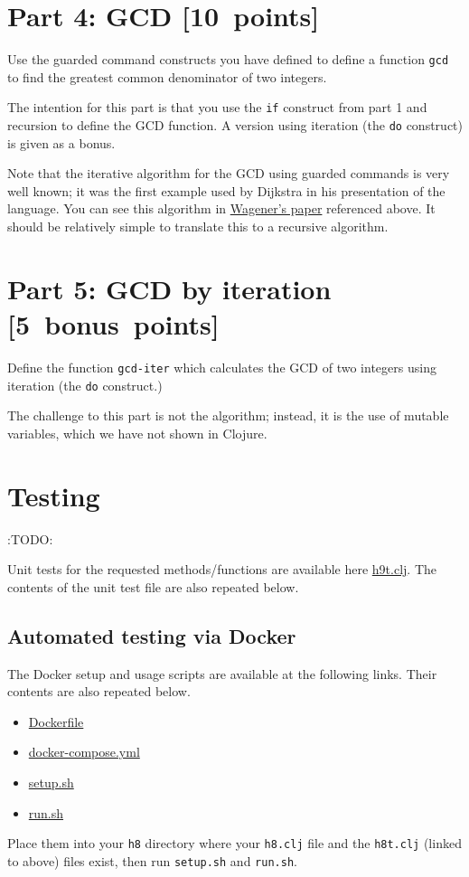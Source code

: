 \documentclass[11pt]{article}
\begin{document}
\section*{Part 4: GCD                                                   [10 points]}
\label{sec:org132c674}
Use the guarded command constructs you have defined
to define a function \texttt{gcd} to find the greatest common denominator
of two integers.

The intention for this part is that you use the \texttt{if} construct
from part 1 and recursion to define the GCD function.
A version using iteration (the \texttt{do} construct) is given as a bonus.

Note that the iterative algorithm for the GCD using guarded commands is
very well known; it was the first example used by Dijkstra
in his presentation of the language.
You can see this algorithm in
\href{https://dl.acm.org/doi/10.5555/1074100.1074433}{Wagener's paper} referenced above.
It should be relatively simple to translate this to a recursive algorithm.

\section*{Part 5: GCD by iteration [5 bonus points]}
\label{sec:org6333cf7}
Define the function \texttt{gcd-iter} which calculates the GCD of two integers
using iteration (the \texttt{do} construct.)

The challenge to this part is not the algorithm;
instead, it is the use of mutable variables,
which we have not shown in Clojure.

\section*{Testing}
\label{sec:org26b41da}
:TODO:


Unit tests for the requested methods/functions
are available here \href{./testing/h9/h9t.clj}{h9t.clj}.
The contents of the unit test file are also repeated below.

\subsection*{Automated testing via Docker}
\label{sec:org3fba615}
The Docker setup and usage scripts are available at the following links.
Their contents are also repeated below.
\begin{itemize}
\item \href{./testing/h8/Dockerfile}{Dockerfile}
\item \href{./testing/h8/docker-compose.yml}{docker-compose.yml}
\item \href{./testing/h8/setup.sh}{setup.sh}
\item \href{./testing/h8/run.sh}{run.sh}
\end{itemize}
Place them into your \texttt{h8} directory where your \texttt{h8.clj} file
and the \texttt{h8t.clj} (linked to above) files exist,
then run \texttt{setup.sh} and \texttt{run.sh}.
\end{document}
